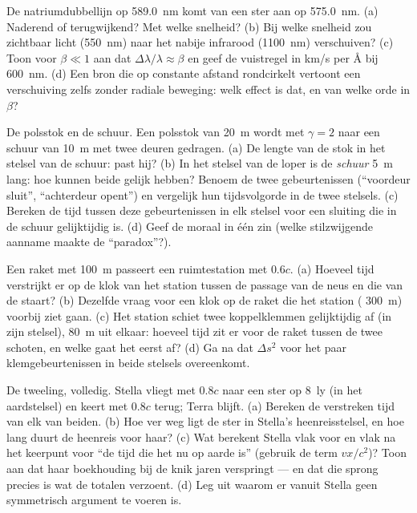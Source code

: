 \begin{exercise}[$\star\star$]\label{exo:b3:relativistic-kinematics:7}
De natriumdubbellijn op \qty{589.0}{nm} komt van een ster aan op
\qty{575.0}{nm}. (a) Naderend of terugwijkend? Met welke snelheid? (b) Bij
welke snelheid zou zichtbaar licht (\qty{550}{nm}) naar het nabije
infrarood (\qty{1100}{nm}) verschuiven? (c) Toon voor $\beta \ll 1$ aan
dat $\Delta\lambda/\lambda \approx \beta$ en geef de vuistregel in km/s per
\unit{\angstrom} bij \qty{600}{nm}. (d) Een bron die op constante afstand
rondcirkelt vertoont een verschuiving zelfs zonder radiale beweging: welk
effect is dat, en van welke orde in $\beta$?
\end{exercise}

\begin{exercise}[$\star\star$]\label{exo:b3:relativistic-kinematics:8}
De polsstok en de schuur. Een polsstok van \qty{20}{m} wordt met $\gamma = 2$ naar een schuur van \qty{10}{m} met twee deuren gedragen. (a) De lengte
van de stok in het stelsel van de schuur: past hij? (b) In het stelsel van
de loper is de \emph{schuur} \qty{5}{m} lang: hoe kunnen beide gelijk
hebben? Benoem de twee gebeurtenissen (``voordeur sluit'', ``achterdeur
opent'') en vergelijk hun tijdsvolgorde in de twee stelsels. (c) Bereken de
tijd tussen deze gebeurtenissen in elk stelsel voor een sluiting die in de
schuur gelijktijdig is. (d) Geef de moraal in één zin (welke stilzwijgende
aanname maakte de ``paradox''?).
\end{exercise}

\begin{exercise}[$\star\star$]\label{exo:b3:relativistic-kinematics:9}
Een raket met  \qty{100}{m} passeert een ruimtestation met
$0.6c$. (a) Hoeveel tijd verstrijkt er op de klok van het station tussen
de passage van de neus en die van de staart? (b) Dezelfde vraag voor een
klok op de raket die het station ( \qty{300}{m}) voorbij ziet
gaan. (c) Het station schiet twee koppelklemmen gelijktijdig af (in zijn
stelsel), \qty{80}{m} uit elkaar: hoeveel tijd zit er voor de raket tussen
de twee schoten, en welke gaat het eerst af? (d) Ga na dat $\Delta s^2$
voor het paar klemgebeurtenissen in beide stelsels overeenkomt.
\end{exercise}

\begin{exercise}[$\star\star\star$]\label{exo:b3:relativistic-kinematics:10}
De tweeling, volledig. Stella vliegt met $0.8c$ naar een ster op
\qty{8}{ly} (in het aardstelsel) en keert met $0.8c$ terug; Terra blijft.
(a) Bereken de verstreken tijd van elk van beiden. (b) Hoe ver weg ligt de
ster in Stella's heenreisstelsel, en hoe lang duurt de heenreis voor haar?
(c) Wat berekent Stella vlak voor en vlak na het keerpunt voor ``de tijd
die het nu op aarde is'' (gebruik de term $vx/c^2$)? Toon aan dat haar
boekhouding bij de knik jaren verspringt --- en dat die sprong precies is
wat de totalen verzoent. (d) Leg uit waarom er vanuit Stella geen
symmetrisch argument te voeren is.
\end{exercise}

